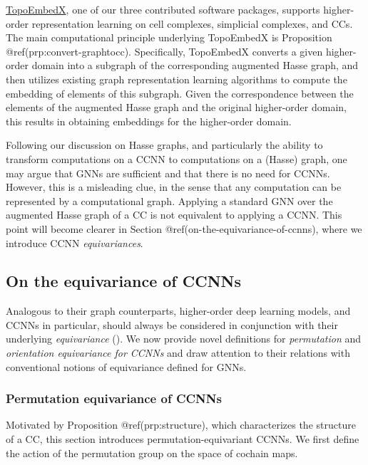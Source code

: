 \documentclass[
  12pt,
]{krantz}
\begin{document}
\href{https://github.com/pyt-team/TopoEmbedX}{TopoEmbedX}, one of our
three contributed software packages, supports higher-order
representation learning on cell complexes, simplicial complexes, and
CCs. The main computational principle underlying TopoEmbedX is
Proposition @ref(prp:convert-graphtocc). Specifically, TopoEmbedX
converts a given higher-order domain into a subgraph of the
corresponding augmented Hasse graph, and then utilizes existing graph
representation learning algorithms to compute the embedding of elements
of this subgraph. Given the correspondence between the elements of the
augmented Hasse graph and the original higher-order domain, this results
in obtaining embeddings for the higher-order domain.

Following our discussion on Hasse graphs, and particularly the ability
to transform computations on a CCNN to computations on a (Hasse) graph,
one may argue that GNNs are sufficient and that there is no need for
CCNNs. However, this is a misleading clue, in the sense that any
computation can be represented by a computational graph. Applying a
standard GNN over the augmented Hasse graph of a CC is not equivalent to
applying a CCNN. This point will become clearer in Section
@ref(on-the-equivariance-of-ccnns), where we introduce CCNN
\emph{equivariances}.

\subsection{On the equivariance of
CCNNs}\label{on-the-equivariance-of-ccnns}

Analogous to their graph counterparts, higher-order deep learning
models, and CCNNs in particular, should always be considered in
conjunction with their underlying \emph{equivariance}
(). We now
provide novel definitions for \emph{permutation} and \emph{orientation
equivariance for CCNNs} and draw attention to their relations with
conventional notions of equivariance defined for GNNs.

\subsubsection{Permutation equivariance of
CCNNs}\label{permutation-equivariance-of-ccnns}

Motivated by Proposition @ref(prp:structure), which characterizes the
structure of a CC, this section introduces permutation-equivariant
CCNNs. We first define the action of the permutation group on the space
of cochain maps.
\end{document}

